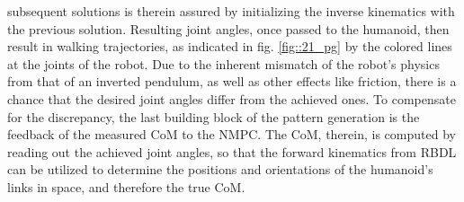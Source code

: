 subsequent solutions is therein assured by initializing the inverse kinematics with the previous solution. Resulting joint angles, once passed to the humanoid, then result in walking trajectories, as indicated in fig. \ref{fig::21_pg} by the colored lines at the joints of the robot. Due to the inherent mismatch of the robot's physics from that of an inverted pendulum, as well as other effects like friction, there is a chance that the desired joint angles differ from the achieved ones. To compensate for the discrepancy, the last building block of the pattern generation is the feedback of the measured CoM to the NMPC. The CoM, therein, is computed by reading out the achieved joint angles, so that the forward kinematics from RBDL can be utilized to determine the positions and orientations of the humanoid's links in space, and therefore the true CoM.





 